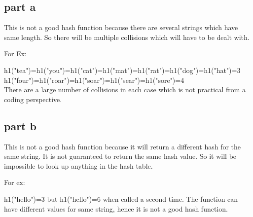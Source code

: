 \documentclass{article}
\begin{document}
\subsection*{part a}

This is not a good hash function because there are several strings which have same length. So there will be multiple collisions which will have to be dealt with.

For Ex:

h1("tea")=h1("you")=h1("cat")=h1("mat")=h1("rat")=h1("dog")=h1("hat")=3\\
h1("four")=h1("roar")=h1("soar")=h1("sear")=h1("sore")=4\\


There are a large number of collisions in each case which is not practical from a coding perspective.

\subsection*{part b}

This is not a good hash function because it will return a different hash for the same string. It is not guaranteed to return the same hash value. So it will be impossible to look 
up anything in the hash table.

For ex:

h1("hello")=3 but h1("hello")=6 when called a second time. The function can have different values for same string, hence it is not a good hash function.
\end{document}
